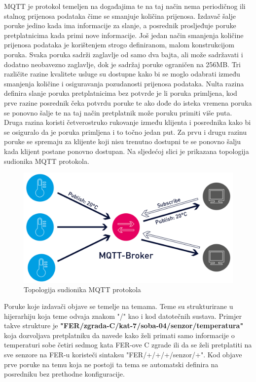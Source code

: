 \documentclass[times, utf8, diplomski]{fer}
\begin{document}
MQTT je protokol temeljen na događajima te na taj način nema periodičnog ili stalnog prijenosa podataka čime se smanjuje količina prijenosa. Izdavač šalje poruke jedino kada ima informacije za slanje, a posrednik prosljeđuje poruke pretplatnicima kada primi nove informacije. Još jedan način smanjenja količine prijenosa podataka je korištenjem strogo definiranom, malom konstrukcijom poruka. Svaka poruka sadrži zaglavlje od samo dva bajta, ali može sadržavati i dodatno neobavezno zaglavlje, dok je sadržaj poruke ograničen na 256MB. Tri različite razine kvalitete usluge su dostupne kako bi se moglo odabrati između smanjenja količine i osiguravanja pozudanosti prijenosa podataka. Nulta razina definira slanje poruka pretplatnicima bez potvrde je li poruka primljena, kod prve razine posrednik čeka potvrdu poruke te ako dođe do isteka vremena poruka se ponovno šalje te na taj način pretplatnik može poruku primiti više puta. Druga razina koristi četverostruko rukovanje između klijenta i posrednika kako bi se osiguralo da je poruka primljena i to točno jedan put. Za prvu i drugu razinu poruke se spremaju za klijente koji nisu trenutno dostupni te se ponovno šalju kada klijent postane ponovno dostupan. Na sljedećoj slici je prikazana topologija sudionika MQTT protokola.
\begin{figure}[htb]
    \centering
    \includegraphics[width=13cm]{images/mqtt.png}
    \caption{Topologija sudionika MQTT protokola\citep{MQTT}}
    \label{fig:mqtt}
\end{figure}

Poruke koje izdavači objave se temelje na temama. Teme su strukturirane u hijerarhiju koja teme odvaja znakom "/" kao i kod datotečnih sustava. Primjer takve strukture je \textbf{"FER/zgrada-C/kat-7/soba-04/senzor/temperatura"} koja dozvoljava pretplatniku da navede kako želi primati samo informacije o temperaturi sobe četiri sedmog kata FER-ove C zgrade ili da se želi pretplatiti na sve senzore na FER-u koristeči sintaksu "FER/+/+/+/senzor/+". Kod objave prve poruke na temu koja ne postoji ta tema se automatski definira na posredniku bez prethodne konfiguracije.
\end{document}

